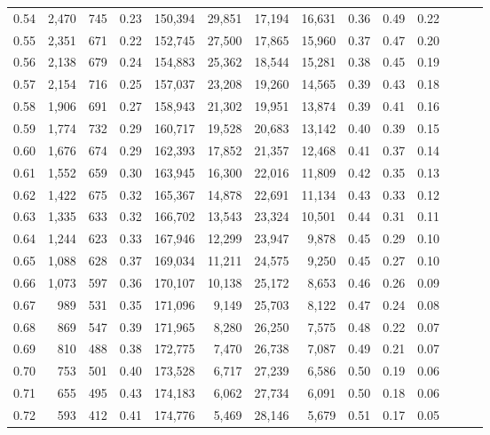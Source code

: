 \begin{tabular}{rrrrrrrrrrrrrr}
0.54 &  2,470 &  745 &  0.23 &  150,394 &   29,851 &  17,194 &  16,631 &  0.36 &  0.49 &      0.22 \\
0.55 &  2,351 &  671 &  0.22 &  152,745 &   27,500 &  17,865 &  15,960 &  0.37 &  0.47 &      0.20 \\
0.56 &  2,138 &  679 &  0.24 &  154,883 &   25,362 &  18,544 &  15,281 &  0.38 &  0.45 &      0.19 \\
0.57 &  2,154 &  716 &  0.25 &  157,037 &   23,208 &  19,260 &  14,565 &  0.39 &  0.43 &      0.18 \\
0.58 &  1,906 &  691 &  0.27 &  158,943 &   21,302 &  19,951 &  13,874 &  0.39 &  0.41 &      0.16 \\
0.59 &  1,774 &  732 &  0.29 &  160,717 &   19,528 &  20,683 &  13,142 &  0.40 &  0.39 &      0.15 \\
0.60 &  1,676 &  674 &  0.29 &  162,393 &   17,852 &  21,357 &  12,468 &  0.41 &  0.37 &      0.14 \\
0.61 &  1,552 &  659 &  0.30 &  163,945 &   16,300 &  22,016 &  11,809 &  0.42 &  0.35 &      0.13 \\
0.62 &  1,422 &  675 &  0.32 &  165,367 &   14,878 &  22,691 &  11,134 &  0.43 &  0.33 &      0.12 \\
0.63 &  1,335 &  633 &  0.32 &  166,702 &   13,543 &  23,324 &  10,501 &  0.44 &  0.31 &      0.11 \\
0.64 &  1,244 &  623 &  0.33 &  167,946 &   12,299 &  23,947 &   9,878 &  0.45 &  0.29 &      0.10 \\
0.65 &  1,088 &  628 &  0.37 &  169,034 &   11,211 &  24,575 &   9,250 &  0.45 &  0.27 &      0.10 \\
0.66 &  1,073 &  597 &  0.36 &  170,107 &   10,138 &  25,172 &   8,653 &  0.46 &  0.26 &      0.09 \\
0.67 &    989 &  531 &  0.35 &  171,096 &    9,149 &  25,703 &   8,122 &  0.47 &  0.24 &      0.08 \\
0.68 &    869 &  547 &  0.39 &  171,965 &    8,280 &  26,250 &   7,575 &  0.48 &  0.22 &      0.07 \\
0.69 &    810 &  488 &  0.38 &  172,775 &    7,470 &  26,738 &   7,087 &  0.49 &  0.21 &      0.07 \\
0.70 &    753 &  501 &  0.40 &  173,528 &    6,717 &  27,239 &   6,586 &  0.50 &  0.19 &      0.06 \\
0.71 &    655 &  495 &  0.43 &  174,183 &    6,062 &  27,734 &   6,091 &  0.50 &  0.18 &      0.06 \\
0.72 &    593 &  412 &  0.41 &  174,776 &    5,469 &  28,146 &   5,679 &  0.51 &  0.17 &      0.05 \\

\end{tabular}
